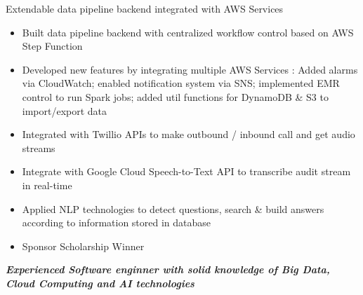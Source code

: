 \documentclass[10pt,a4paper,ragged2e,withhyper]{altacv}
\begin{document}
\begin{paracol}{2}

   {Extendable data pipeline backend integrated with AWS Services}
  \begin{itemize}
    \item Built data pipeline backend with centralized workflow control based on AWS Step Function
    \item Developed new features by integrating multiple AWS Services : Added alarms via CloudWatch; enabled notification system via SNS; implemented EMR control to run Spark jobs; added util functions for DynamoDB \& S3 to import/export data
  \end{itemize}

  \divider


  \begin{itemize}
    \item Integrated with Twillio APIs to make outbound / inbound call and get audio streams
    \item Integrate with Google Cloud Speech-to-Text API to transcribe audit stream in real-time
    \item Applied NLP technologies to detect questions, search \& build answers according to information stored in database
    \item Sponsor Scholarship Winner
  \end{itemize}

  \switchcolumn

  \textbf{\emph{Experienced Software enginner with solid knowledge of Big Data, Cloud Computing and AI technologies}}




   \\


\end{paracol}
\end{document}
